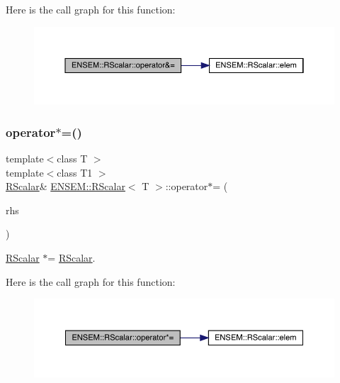 Here is the call graph for this function\+:
\nopagebreak
\begin{figure}[H]
\begin{center}
\leavevmode
\includegraphics[width=350pt]{d0/d8c/classENSEM_1_1RScalar_aa091ededdea0fc13deb359321f213780_cgraph}
\end{center}
\end{figure}
\mbox{\label{classENSEM_1_1RScalar_a4e8f4b8988a47a5e5eef56424d0e23d9}} 
\subsubsection{\texorpdfstring{operator$\ast$=()}{operator*=()}\hspace{0.1cm}{\footnotesize\ttfamily [1/3]}}
{\footnotesize\ttfamily template$<$class T $>$ \\
template$<$class T1 $>$ \\
\mbox{\hyperlink{classENSEM_1_1RScalar}{R\+Scalar}}\& \mbox{\hyperlink{classENSEM_1_1RScalar}{E\+N\+S\+E\+M\+::\+R\+Scalar}}$<$ T $>$\+::operator$\ast$= (\begin{DoxyParamCaption}\item[{const \mbox{\hyperlink{classENSEM_1_1RScalar}{R\+Scalar}}$<$ T1 $>$ \&}]{rhs }\end{DoxyParamCaption})\hspace{0.3cm}{\ttfamily [inline]}}



\mbox{\hyperlink{classENSEM_1_1RScalar}{R\+Scalar}} $\ast$= \mbox{\hyperlink{classENSEM_1_1RScalar}{R\+Scalar}}. 

Here is the call graph for this function\+:
\nopagebreak
\begin{figure}[H]
\begin{center}
\leavevmode
\includegraphics[width=350pt]{d0/d8c/classENSEM_1_1RScalar_a4e8f4b8988a47a5e5eef56424d0e23d9_cgraph}
\end{center}
\end{figure}
\mbox{\label{classENSEM_1_1RScalar_a4e8f4b8988a47a5e5eef56424d0e23d9}} 
